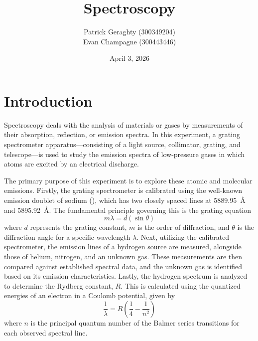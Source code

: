 \documentclass[11pt]{article}
\title{Spectroscopy}
\date{April 3, 2026}
\author{
    Patrick Geraghty (300349204) \\
    Evan Champagne (300443446)
}
\begin{document}
\maketitle

    \section{Introduction}\label{sec:introduction}

        Spectroscopy deals with the analysis of materials or gases by
        measurements of their absorption, reflection, or emission spectra.
        In this experiment, a grating spectrometer apparatus---consisting
        of a light source, collimator, grating, and telescope---is used to
        study the emission spectra of low-pressure gases in which atoms are
        excited by an electrical discharge.

        The primary purpose of this experiment is to explore these atomic and
        molecular emissions.
        Firstly, the grating spectrometer is calibrated using the well-known
        emission doublet of sodium (), which has two closely spaced
        lines at \SI{5889.95}{\angstrom} and \SI{5895.92}{\angstrom}.
        The fundamental principle governing this is the grating equation
        \begin{equation}
            m \lambda = d (\sin \theta)
            \label{eq:grating}
        \end{equation}
        where \( d \) represents the grating constant, \( m \) is the order of
        diffraction, and \( \theta \) is the diffraction angle for a specific
        wavelength \( \lambda \).
        Next, utilizing the calibrated spectrometer, the emission lines of
        a hydrogen source are measured, alongside those of helium, nitrogen,
        and an unknown gas.
        These measurements are then compared against established spectral
        data, and the unknown gas is identified based on its emission
        characteristics.
        Lastly, the hydrogen spectrum is analyzed to determine the Rydberg
        constant, \( R \).
        This is calculated using the quantized energies of an electron in a
        Coulomb potential, given by
        \begin{equation}
            \frac{1}{\lambda} = R \left( \frac{1}{4} - \frac{1}{n^2} \right)
            \label{eq:rydberg}
        \end{equation}
        where \( n \) is the principal quantum number of the Balmer series
        transitions for each observed spectral line.
\end{document}
